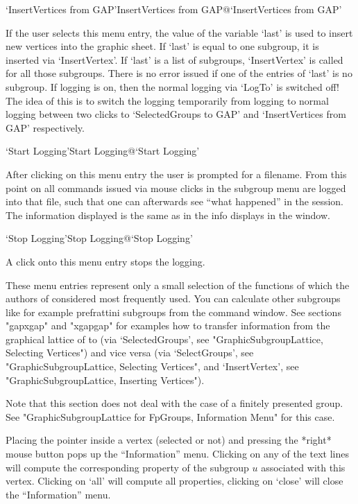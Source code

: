 \>`InsertVertices from GAP'{InsertVertices from GAP}@{`InsertVertices from GAP'}

If the user selects this  menu entry, the  value of the variable `last'  is
used to insert new vertices into the graphic sheet.  If  `last' is equal to
one subgroup, it  is inserted via  `InsertVertex'. If `last'  is a list  of
subgroups, `InsertVertex' is  called for all  those subgroups. There is  no
error  issued if one of  the entries of `last'   is no subgroup. If {\XGAP}
logging is on, then the normal {\GAP} logging via `LogTo'  is switched off! 
The idea of this is to switch  the logging temporarily from {\XGAP} logging
to normal  {\GAP} logging between two clicks  to  `SelectedGroups to GAP'
and `InsertVertices from GAP' respectively.

\>`Start Logging'{Start Logging}@{`Start Logging'}

After clicking on this menu entry the user is prompted for a filename. From 
this point on all commands issued via mouse clicks in the subgroup menu are 
logged into that file, such that one can afterwards see ``what happened''
in the {\XGAP} session. The information displayed is the same as in the
info displays in the {\GAP} window. 

\>`Stop Logging'{Stop Logging}@{`Stop Logging'}

A click onto this menu entry stops the {\XGAP} logging.

\bigskip%

These menu entries represent only a small selection of the functions
of {\GAP} which the authors of {\XGAP} considered most frequently
used. You can calculate other subgroups like for example prefrattini
subgroups from the {\GAP} command window. See sections "gapxgap" and
"xgapgap" for examples how to transfer information from the graphical
lattice of {\XGAP} to {\GAP} (via `SelectedGroups', see
"GraphicSubgroupLattice, Selecting Vertices") and vice versa (via
`SelectGroups', see "GraphicSubgroupLattice, Selecting Vertices", and
`InsertVertex', see "GraphicSubgroupLattice, Inserting Vertices").



Note that this section does not deal with the case of a finitely presented
group. See "GraphicSubgroupLattice for FpGroups, Information Menu" for this 
case.

Placing the pointer  inside a vertex (selected  or not)  and pressing the
*right* mouse button pops up the  ``Information'' menu.  Clicking on any of
the text  lines will compute  the corresponding  property of the subgroup
$u$ associated  with  this vertex.  Clicking   on `all' will  compute all
properties, clicking on `close' will close the ``Information'' menu.

